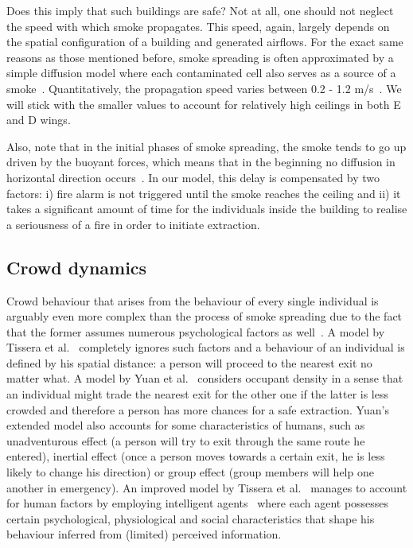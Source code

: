 Does this imply that such buildings are safe?
Not at all, one should not neglect the speed with which smoke propagates.
This speed, again, largely depends on the spatial configuration of a building
and generated airflows.
For the exact same reasons as those mentioned before, smoke spreading is often
approximated by a simple diffusion model where each contaminated cell also
serves as a source of a smoke~\cite{Tissera1, Tissera2}.
Quantitatively, the propagation speed varies between 0.2 - 1.2 m/s~\cite{Smoke}.
We will stick with the smaller values to account for relatively high ceilings in
both E and D wings.

Also, note that in the initial phases of smoke spreading, the smoke tends to go
up driven by the buoyant forces, which means that in the beginning no diffusion
in horizontal direction occurs~\cite{Curiac}.
In our model, this delay is compensated by two factors: i) fire alarm is not
triggered until the smoke reaches the ceiling and ii) it takes a significant
amount of time for the individuals inside the building to realise a
seriousness of a fire in order to initiate extraction.

\subsection{Crowd dynamics}
Crowd behaviour that arises from the behaviour of every single individual is
arguably even more complex than the process of smoke spreading due to the fact
that the former assumes numerous psychological factors as well~\cite{Ying, Yuan}.
A model by Tissera et al.~\cite{Tissera1} completely ignores such factors and a
behaviour of an individual is defined by his spatial distance: a person will
proceed to the nearest exit no matter what.
A model by Yuan et al.~\cite{Yuan} considers occupant density in a sense
that an individual might trade the nearest exit for the other one if the latter
is less crowded and therefore a person has more chances for a safe extraction.
Yuan's extended model also accounts for some characteristics of humans,
such as unadventurous effect (a person will try to exit through the same route
he entered), inertial effect (once a person moves towards a certain exit, he is
less likely to change his direction) or group effect (group members will help
one another in emergency).
An improved model by Tissera et al.~\cite{Tissera2} manages to account for human
factors by employing intelligent agents~\cite{AI} where each agent possesses
certain psychological, physiological and social characteristics that shape his
behaviour inferred from (limited) perceived information.


